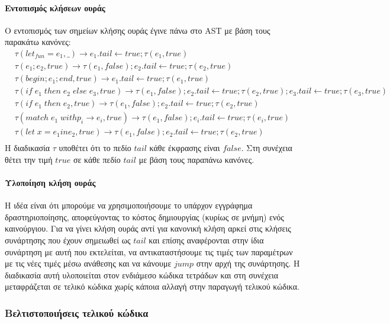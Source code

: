 \documentclass[12pt]{article}
\begin{document}
\paragraph{Εντοπισμός κλήσεων ουράς}
Ο εντοπισμός των σημείων κλήσης ουράς έγινε πάνω στο AST με βάση τους παρακάτω κανόνες:
\begin{align*}
  & \tau(let_{fun} = e_1, \_) \rightarrow e_1.tail \leftarrow true;\tau(e_1, true) \\[0.3em]
  & \tau(e_1;e_2, true) \rightarrow \tau(e_1, false); e_2.tail \leftarrow true ; \tau(e_2, true) \\[0.3em]
  & \tau(begin; e_1; end, true) \rightarrow e_1.tail \leftarrow true ; \tau(e_1, true) \\[0.3em]
  & \tau(if \; e_1 \; then \; e_2 \; else \; e_3, true) \rightarrow \tau(e_1, false); e_2.tail \leftarrow true ; \tau(e_2, true); e_3.tail \leftarrow true ; \tau(e_3, true) \\[0.3em]
  & \tau(if \; e_1 \; then \; e_2, true) \rightarrow \tau(e_1, false); e_2.tail \leftarrow true ; \tau(e_2, true) \\[0.3em]
  & \tau(match \; e_1 \; with p_i \rightarrow e_i, true) \rightarrow \tau(e_1, false); e_i.tail \leftarrow true ; \tau(e_i, true) \\[0.3em]
  & \tau(let \; x = e_1 in e_2, true) \rightarrow \tau(e_1, false); e_2.tail \leftarrow true ; \tau(e_2, true) \\[0.3em]
\end{align*}
Η διαδικασία $\tau$ υποθέτει ότι το πεδίο $tail$ κάθε έκφρασης είναι $false$. Στη συνέχεια θέτει την τιμή $true$ σε κάθε πεδίο $tail$ με βάση τους παραπάνω κανόνες.
\paragraph{Υλοποίηση κλήση ουράς}
Η ιδέα είναι ότι μπορούμε να χρησιμοποιήσουμε το υπάρχον εγγράφημα δραστηριοποίησης, αποφεύγοντας το κόστος δημιουργίας (κυρίως σε μνήμη) ενός καινούργιου.
Για να γίνει κλήση ουράς αντί για κανονική κλήση αρκεί στις κλήσεις συνάρτησης που έχουν σημειωθεί ως $tail$ και επίσης αναφέρονται στην ίδια συνάρτηση με αυτή που εκτελείται, να αντικαταστήσουμε τις τιμές των παραμέτρων με τις νέες τιμές μέσω ανάθεσης και να κάνουμε $jump$ στην αρχή της συνάρτησης. Η διαδικασία αυτή υλοποιείται στον ενδιάμεσο κώδικα τετράδων και στη συνέχεια μεταφράζεται σε τελικό κώδικα χωρίς κάποια αλλαγή στην παραγωγή τελικού κώδικα.
\subsubsection{Βελτιστοποιήσεις τελικού κώδικα}
\end{document}

